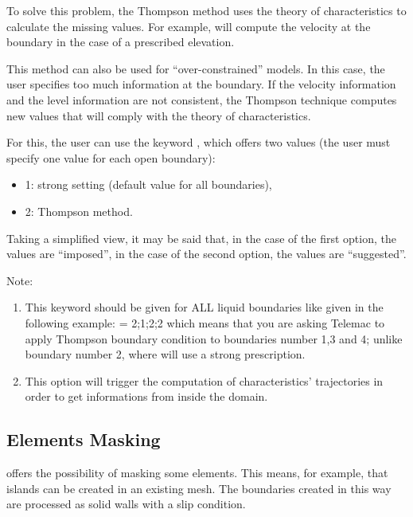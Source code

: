 To solve this problem, the Thompson method uses the theory of characteristics
to calculate the missing values.
For example,  will compute the velocity at the boundary in the case
of a prescribed elevation.

This method can also be used for ``over-constrained'' models.
In this case, the user specifies too much information at the boundary.
If the velocity information and the level information are not consistent,
the Thompson technique computes new values that will comply
with the theory of characteristics.

For this, the user can use the keyword ,
which offers two values (the user must specify one value for each open boundary):

\begin{itemize}
\item 1: strong setting (default value for all boundaries),

\item 2: Thompson method.
\end{itemize}

Taking a simplified view, it may be said that, in the case of the first option,
the values are ``imposed'', in the case of the second option, the values are
``suggested''.

\begin{WarningBlock}{Note:}
\begin{enumerate}
\item This keyword should be given for ALL liquid boundaries like given in the
following example: \newline
{}= 2;1;2;2 \newline
which means that you are asking Telemac to apply Thompson boundary condition to
boundaries number 1,3 and 4;
unlike boundary number 2, where  will use a strong prescription.
\item This option will trigger the computation of characteristics' trajectories
in order to get informations from inside the domain.
\end{enumerate}
\end{WarningBlock}

\subsection{Elements Masking}

 offers the possibility of masking some elements.
This means, for example, that islands can be created in an existing mesh.
The boundaries created in this way are processed as solid walls with a slip
condition.

